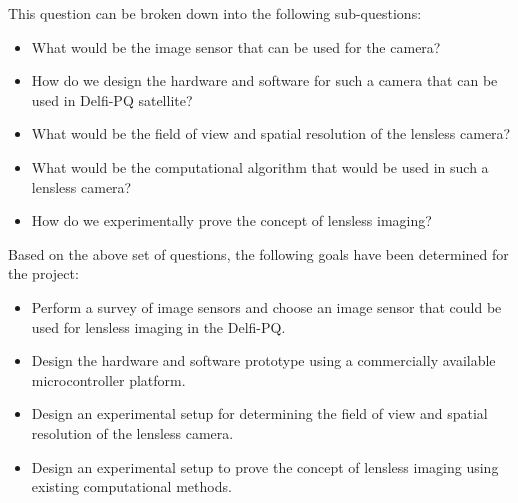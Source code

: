 This question can be broken down into the following sub-questions:
\begin{itemize}
\item What would be the image sensor that can be used for the camera? 
\item How do we design the hardware and software for such a camera that can be used in Delfi-PQ satellite?
\item What would be the field of view and spatial resolution of the lensless camera?
\item What would be the computational algorithm that would be used in such a lensless camera? 
\item How do we experimentally prove the concept of lensless imaging?

\end{itemize}

Based on the above set of questions, the following goals have been determined for the project:
\begin{itemize}
\item Perform a survey of image sensors and choose an image sensor that could be used for lensless imaging in the Delfi-PQ.
\item Design the hardware and software prototype using a commercially available microcontroller platform.
\item Design an experimental setup for determining the field of view and spatial resolution of the lensless camera.
\item Design an experimental setup to prove the concept of lensless imaging using existing computational methods. 
\end{itemize}
